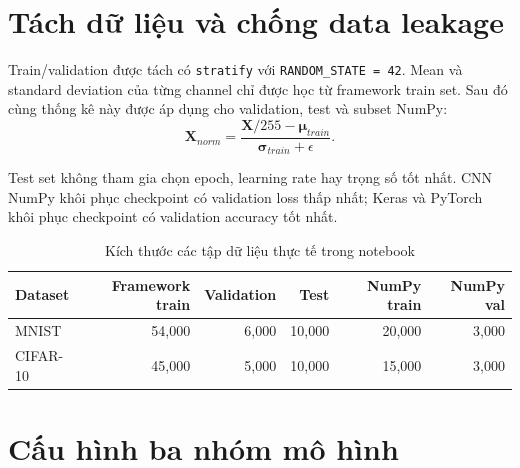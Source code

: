 \documentclass[12pt,a4paper]{report}
\begin{document}
\section{Tách dữ liệu và chống data leakage}
Train/validation được tách có \texttt{stratify} với \texttt{RANDOM\_STATE = 42}.
Mean và standard deviation của từng channel chỉ được học từ framework train set.
Sau đó cùng thống kê này được áp dụng cho validation, test và subset NumPy:
\begin{equation}
    \mathbf{X}_{norm}=\frac{\mathbf{X}/255-\boldsymbol{\mu}_{train}}
    {\boldsymbol{\sigma}_{train}+\epsilon}.
\end{equation}

Test set không tham gia chọn epoch, learning rate hay trọng số tốt nhất.
CNN NumPy khôi phục checkpoint có validation loss thấp nhất; Keras và PyTorch khôi phục checkpoint có validation accuracy tốt nhất.

\begin{table}[H]
\centering
\caption{Kích thước các tập dữ liệu thực tế trong notebook}
\label{tab:data_splits}
\begin{tabular}{lrrrrr}
\toprule
\textbf{Dataset} & \textbf{Framework train} & \textbf{Validation} & \textbf{Test} & \textbf{NumPy train} & \textbf{NumPy val} \\
\midrule
MNIST & 54,000 & 6,000 & 10,000 & 20,000 & 3,000 \\
CIFAR-10 & 45,000 & 5,000 & 10,000 & 15,000 & 3,000 \\
\bottomrule
\end{tabular}
\end{table}

\section{Cấu hình ba nhóm mô hình}
\begin{table}[H]
\centering
\caption{Cấu hình CNN NumPy theo từng dataset}
\label{tab:numpy_config}
\end{table}
\end{document}
